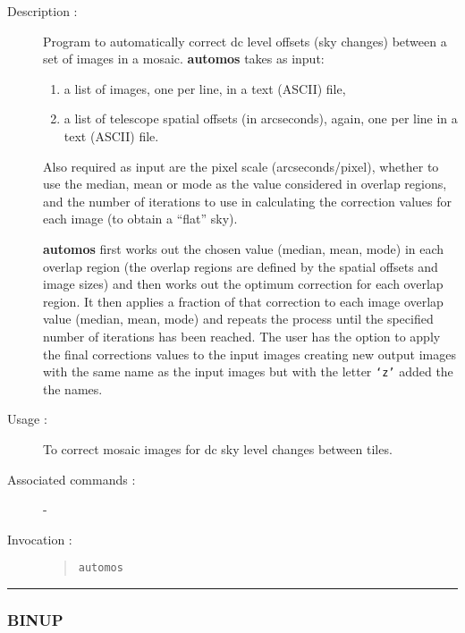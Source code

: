 \begin{description}

\item[Description :] Program to automatically correct dc level offsets
(sky changes) between a set of images in a mosaic.  {\bf automos} takes as
input:

\begin{enumerate}

\item a list of images, one per line, in a text (ASCII) file,

\item a list of telescope spatial offsets (in arcseconds), again,
one per line in a text (ASCII) file.

\end{enumerate}

Also required as input are the pixel scale (arcseconds/pixel), whether
to use the median, mean or mode as the value considered in overlap
regions, and the number of iterations to use in calculating the
correction values for each image (to obtain a ``flat'' sky).

{\bf automos} first works out the chosen value (median, mean,
mode) in each overlap region (the overlap regions are defined by the
spatial offsets and image sizes) and then works out the optimum
correction for each overlap region. It then applies a fraction of that
correction to each image overlap value (median, mean, mode) and repeats
the process until the specified number of iterations has been reached.
The user has the option to apply the final corrections values to the
input images creating new output images with the same name as the input
images but with the letter {\tt `z'} added the the names.

\item[Usage :] To correct mosaic images for dc sky level changes between
tiles.
\item[Associated commands :] -
\item[Invocation :]

\begin{quote}{\tt automos }\end{quote}

\end{description}

\hrule
\subsubsection*{\label{BINUP}BINUP}

